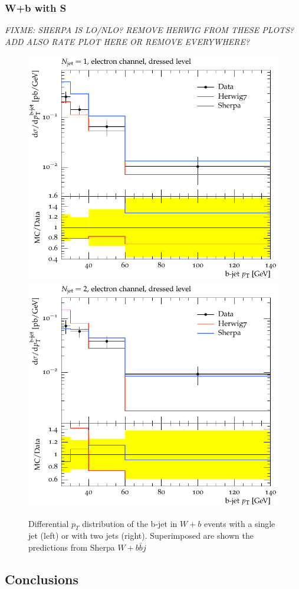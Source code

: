 \documentclass[11pt]{cernrep} \usepackage{graphicx,epsfig} 
\newcommand{\Sherpa}{S\protect\scalebox{0.8}{HERPA}\xspace}
\newcommand{\pt}{\ensuremath{p_{T}}\xspace}
\begin{document}
\subsubsection{W+b with \Sherpa}

{\em FIXME: SHERPA IS LO/NLO? REMOVE HERWIG FROM THESE PLOTS? ADD ALSO RATE PLOT HERE OR REMOVE EVERYWHERE?}

\begin{figure}[htbp]
\begin{center}
   \includegraphics[scale=0.65]{figs/wbb/sherpa/subtracted_h7_s22-1jet.pdf}
   \includegraphics[scale=0.65]{figs/wbb/sherpa/subtracted_h7_s22-2jet.pdf}
\end{center}
\caption{Differential \pt distribution of the b-jet in $W+b$ events with a single jet (left) or with two jets (right). Superimposed are
shown the predictions from Sherpa $W+b\bar{b}j$}
\label{wbb-pt-sherpa}
\end{figure}

\subsection{Conclusions \label{concl}}


\end{document}
